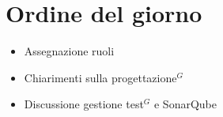 \section*{Ordine del giorno}

\begin{itemize}
	\item Assegnazione ruoli
	\item Chiarimenti sulla progettazione$^G$
	\item Discussione gestione test$^G$ e SonarQube
\end{itemize}

